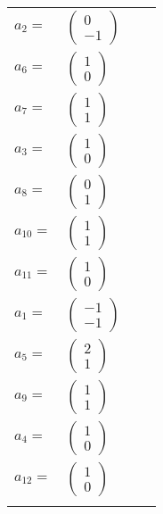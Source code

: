 \documentclass[1p]{elsarticle_modified}
\theoremstyle{definition}
\begin{document}
\begin{tabular}{m{7pt} m{180pt} m{7pt} m{180pt} }
\flushright $a_{2}=$&$\begin{pmatrix}0\\-1\end{pmatrix}$ \\
\flushright $a_{6}=$&$\begin{pmatrix}1\\0\end{pmatrix}$ \\
\flushright $a_{7}=$&$\begin{pmatrix}1\\1\end{pmatrix}$ \\
\flushright $a_{3}=$&$\begin{pmatrix}1\\0\end{pmatrix}$ \\
\flushright $a_{8}=$&$\begin{pmatrix}0\\1\end{pmatrix}$ \\
\flushright $a_{10}=$&$\begin{pmatrix}1\\1\end{pmatrix}$ \\
\flushright $a_{11}=$&$\begin{pmatrix}1\\0\end{pmatrix}$ \\
\flushright $a_{1}=$&$\begin{pmatrix}-1\\-1\end{pmatrix}$ \\
\flushright $a_{5}=$&$\begin{pmatrix}2\\1\end{pmatrix}$ \\
\flushright $a_{9}=$&$\begin{pmatrix}1\\1\end{pmatrix}$ \\
\flushright $a_{4}=$&$\begin{pmatrix}1\\0\end{pmatrix}$ \\
\flushright $a_{12}=$&$\begin{pmatrix}1\\0\end{pmatrix}$\\&\end{tabular}
\end{document}
